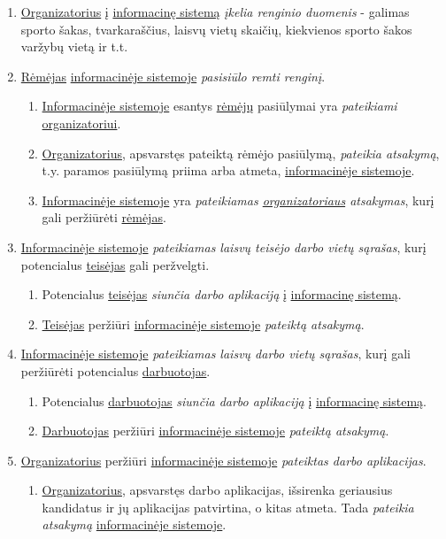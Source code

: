 \documentclass{VUMIFPSkursinis}
\begin{document}
      \begin{enumerate}
        \item \underline{Organizatorius} į \underline{informacinę sistemą} \textit{įkelia renginio duomenis} - galimas sporto šakas, tvarkaraščius, laisvų vietų skaičių, kiekvienos sporto šakos varžybų vietą ir t.t. 
        \item \underline{Rėmėjas} \underline{informacinėje sistemoje} \textit{pasisiūlo remti renginį}. 
          \begin{enumerate}
            \item \underline{Informacinėje sistemoje} esantys \underline{rėmėjų} pasiūlymai yra \textit{pateikiami} \underline{organizatoriui}.
            \item \underline{Organizatorius}, apsvarstęs pateiktą rėmėjo pasiūlymą, \textit{pateikia atsakymą}, t.y. paramos pasiūlymą priima arba atmeta, \underline{informacinėje sistemoje}.
            \item \underline{Informacinėje sistemoje} yra \textit{pateikiamas \underline{organizatoriaus} atsakymas}, kurį gali peržiūrėti \underline{rėmėjas}.
          \end{enumerate}
        \item \underline{Informacinėje sistemoje} \textit{pateikiamas laisvų teisėjo darbo vietų sąrašas}, kurį potencialus \underline{teisėjas} gali peržvelgti.
          \begin{enumerate}
            \item Potencialus \underline{teisėjas} \textit{siunčia darbo aplikaciją} į \underline{informacinę sistemą}.
            \item \underline{Teisėjas} peržiūri \underline{informacinėje sistemoje} \textit{pateiktą atsakymą}.
          \end{enumerate}
        \item \underline{Informacinėje sistemoje} \textit{pateikiamas laisvų darbo vietų sąrašas}, kurį gali peržiūrėti potencialus \underline{darbuotojas}.
          \begin{enumerate}
            \item Potencialus \underline{darbuotojas} \textit{siunčia darbo aplikaciją} į \underline{informacinę sistemą}.
            \item \underline{Darbuotojas} peržiūri \underline{informacinėje sistemoje} \textit{pateiktą atsakymą}.
          \end{enumerate}
        \item \underline{Organizatorius} peržiūri \underline{informacinėje sistemoje} \textit{pateiktas darbo aplikacijas}.
          \begin{enumerate}
            \item \underline{Organizatorius}, apsvarstęs darbo aplikacijas, išsirenka geriausius kandidatus ir jų aplikacijas patvirtina, o kitas atmeta. Tada \textit{pateikia atsakymą}  \underline{informacinėje sistemoje}.
          \end{enumerate}
      \end{enumerate}
\end{document}
